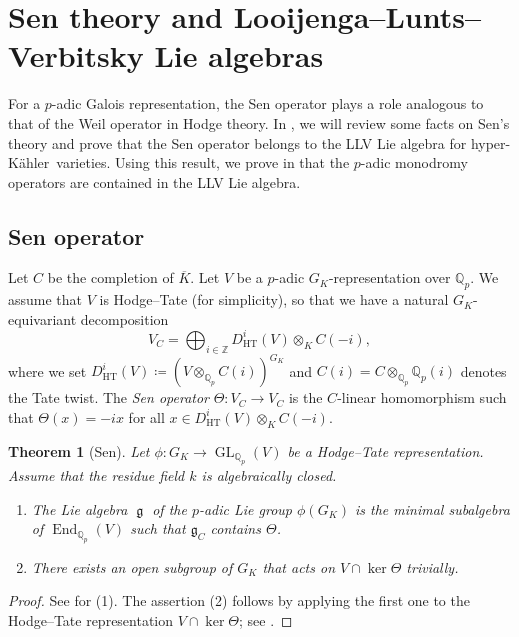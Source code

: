 \documentclass[12pt,reqno]{amsart}
\newtheorem{thm}{Theorem}[section]
\theoremstyle{definition}
\newcommand{\Q}{{\mathds Q}}
\newcommand{\Z}{{\mathds Z}}
\newcommand\End{\mathop{\mathrm{End}}\nolimits}
\newcommand\GL{\mathop{\mathrm{GL}}\nolimits}
\renewcommand\ge{\mathop{\mathfrak{g}}\nolimits}
\newcommand{\hk}{hyper-Kähler~}
\newcommand{\frg}{\mathfrak{g}}
\numberwithin{equation}{section}
\begin{document}
\section{Sen theory and Looijenga--Lunts--Verbitsky Lie algebras}\label{Section:Sen theory and LLV Lie algebras}
For a $p$-adic Galois representation,
the Sen operator plays a role analogous to that of the Weil operator in Hodge theory.
In , we will review some facts on Sen's theory and prove that the Sen operator belongs to the LLV Lie algebra for \hk varieties.
Using this result, we prove in  that the $p$-adic monodromy operators are contained in the LLV Lie algebra.

\subsection{Sen operator}
\label{Subsection:Sen operator}


Let $C$ be the completion of $\overline{K}$.
Let 
$V$
be a $p$-adic $G_K$-representation over $\Q_p$.
We assume that $V$ is Hodge--Tate (for simplicity), so that we have a natural $G_K$-equivariant decomposition
\[
V_C = \bigoplus_{i \in \Z} D^i_{\mathrm{HT}}(V)\otimes_{K} C(-i),
\]
where
we set
$D^i_{\mathrm{HT}}(V)\coloneqq (V \otimes_{\Q_p} C(i))^{G_K}$
and $C(i)=C \otimes_{\Q_p} \Q_p(i)$ denotes the Tate twist.
The \textit{Sen operator}
$\Theta \colon V_C \to V_C$
is the $C$-linear homomorphism such that
$\Theta(x)=-ix$ for all $x \in D^i_{\mathrm{HT}}(V)\otimes_{K} C(-i)$.





\begin{thm}[Sen]\label{thm:Sen}
	Let
	$
	\phi \colon G_K \to \GL_{\Q_p}(V)
	$
    be a Hodge--Tate representation.
    Assume that the residue field $k$ is algebraically closed.
    \begin{enumerate}
        \item The Lie algebra $\ge$ of the $p$-adic Lie group  $\phi(G_K)$ is the minimal subalgebra of $\End_{\Q_p}(V)$ such that $\frg_{C}$ contains $\Theta$.
        \item There exists an open subgroup of $G_K$ that acts on $V \cap \ker \Theta$ trivially.
    \end{enumerate}
\end{thm}

\begin{proof}
    See \cite[Theorem 1]{Sen1973a} for (1).
    The assertion (2) follows by applying the first one to the Hodge--Tate representation $V \cap \ker \Theta$; see \cite[Corollary 1]{Sen1973a}.
\end{proof}
\end{document}
